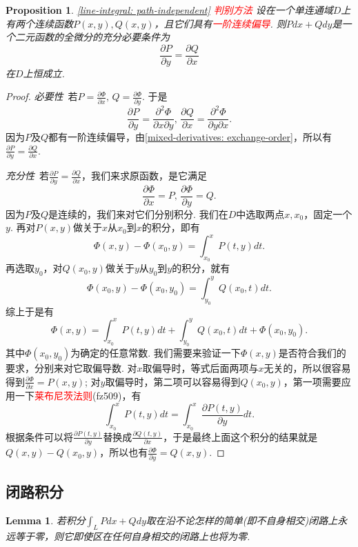\documentclass{article}
\newtheorem{lemma}[theorem]{Lemma}
\newtheorem{proposition}[theorem]{Proposition}
\newcommand{\redt}[1]{\textcolor{red}{#1}}
\begin{document}
\begin{proposition}
\rm \redt{\ref{line-integral: path-independent} 判别方法} 设在一个单连通域$D$上有两个连续函数$P(x,y),Q(x,y)$，且它们具有\redt{一阶连续偏导}. 则$Pdx + Qdy$是一个二元函数的全微分的充分必要条件为
$$
\frac{\partial P}{\partial y} = \frac{\partial Q}{\partial x}
$$
在$D$上恒成立. 
\end{proposition}

\begin{proof}
\rm \emph{必要性}\ 若$P = \frac{\partial \Phi}{\partial x},
\,Q = \frac{\partial \Phi}{\partial y}$. 于是
$$
\frac{\partial P}{\partial y} = \frac{\partial^2\Phi}{\partial x\partial y},\,\frac{\partial Q}{\partial x} = \frac{\partial^2\Phi}{\partial y\partial x}.
$$
因为$P$及$Q$都有一阶连续偏导，由\ref{mixed-derivatives: exchange-order}，所以有$\frac{\partial P}{\partial y} = \frac{\partial Q}{\partial x}$.

\emph{充分性}\ 若$\frac{\partial P}{\partial y} = \frac{\partial Q}{\partial x}$，我们来求原函数，是它满足
$$
\frac{\partial \Phi}{\partial x} = P,
\, \frac{\partial \Phi}{\partial y} = Q.
$$
因为$P$及$Q$是连续的，我们来对它们分别积分. 我们在$D$中选取两点$x,x_0$，固定一个$y$. 再对$P(x,y)$做关于$x$从$x_0$到$x$的积分，即有
$$
\Phi(x,y) - \Phi(x_0,y) = \int_{x_0}^{x} P(t,y)dt. 
$$
再选取$y_0$，对$Q(x_0,y)$做关于$y$从$y_0$到$y$的积分，就有
$$
\Phi(x_0,y)-\Phi(x_0,y_0) = \int_{y_0}^{y} Q(x_0,t)dt. 
$$
综上于是有
$$
\Phi(x,y) = \int_{x_0}^{x} P(t,y)dt + \int_{y_0}^{y} Q(x_0,t)dt + \Phi(x_0,y_0).
$$
其中$\Phi(x_0,y_0)$为确定的任意常数. 我们需要来验证一下$\Phi(x,y)$是否符合我们的要求，分别来对它取偏导数. 对$x$取偏导时，等式后面两项与$x$无关的，所以很容易得到$\frac{\partial \Phi}{\partial x} = P(x,y)$; 对$y$取偏导时，第二项可以容易得到$Q(x_0,y)$，第一项需要应用一下\redt{莱布尼茨法则}(fz509)，有
$$
\int_{x_0}^{x}P(t,y)dt = \int_{x_0}^{x} \frac{\partial P(t,y)}{\partial y}dt.
$$ 
根据条件可以将$\frac{\partial P(t,y)}{\partial y}$替换成$\frac{\partial Q(t,y)}{\partial x}$，于是最终上面这个积分的结果就是
$Q(x,y)-Q(x_0,y)$，所以也有$\frac{\partial \Phi}{\partial y} = Q(x,y)$.

\end{proof}

\subsection{闭路积分}

\begin{lemma}
\rm 若积分$\int_L Pdx+Qdy$取在沿不论怎样的简单(即不自身相交)闭路上永远等于零，则它即使区在任何自身相交的闭路上也将为零.
\end{lemma}
\end{document}
